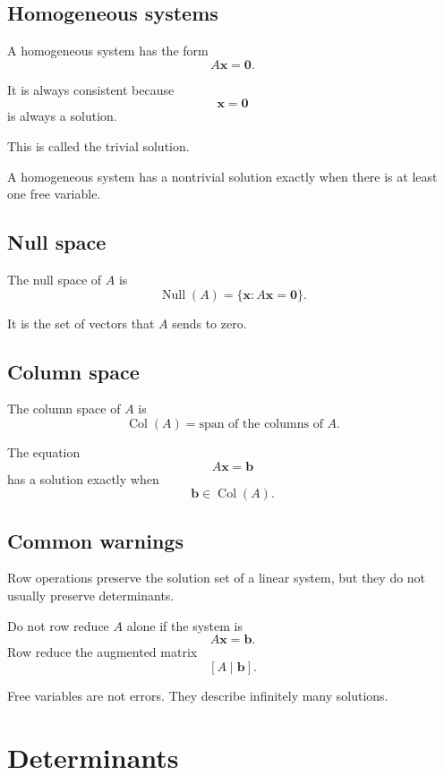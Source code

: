 \subsection*{Homogeneous systems}

A homogeneous system has the form
\[
\boxed{
    A\mathbf x=\mathbf 0.
}
\]

It is always consistent because
\[
    \mathbf x=\mathbf 0
\]
is always a solution.

This is called the trivial solution.

A homogeneous system has a nontrivial solution exactly when there is at least one free
variable.

\subsection*{Null space}

The null space of \(A\) is
\[
\boxed{
    \operatorname{Null}(A)
    =
    \{\mathbf x:A\mathbf x=\mathbf 0\}.
}
\]

It is the set of vectors that \(A\) sends to zero.

\subsection*{Column space}

The column space of \(A\) is
\[
\boxed{
    \operatorname{Col}(A)
    =
    \text{span of the columns of }A.
}
\]

The equation
\[
    A\mathbf x=\mathbf b
\]
has a solution exactly when
\[
\boxed{
    \mathbf b\in\operatorname{Col}(A).
}
\]

\subsection*{Common warnings}

Row operations preserve the solution set of a linear system, but they do not usually
preserve determinants.

Do not row reduce \(A\) alone if the system is
\[
    A\mathbf x=\mathbf b.
\]
Row reduce the augmented matrix
\[
    [A\mid \mathbf b].
\]

Free variables are not errors.  They describe infinitely many solutions.

\section{Determinants}
\label{app:C.3}

